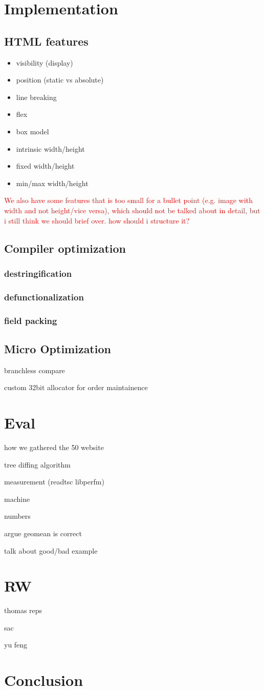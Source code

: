 \documentclass[format=acmsmall, review=false, screen=true]{acmart}
\newcommand\todo[1]{\textcolor{red}{#1}}
\begin{document}
\section{Implementation}
\subsection{HTML features}
\begin{itemize}
	\item visibility (display)
	\item position (static vs absolute)
	\item line breaking
	\item flex
	\item box model
	\item intrinsic width/height
	\item fixed width/height
	\item min/max width/height
\end{itemize}
\todo{We also have some features that is too small for a bullet point (e.g. image with width and not height/vice versa), which should not be talked about in detail, but i still think we should brief over. how should i structure it?}
\subsection{Compiler optimization}
\subsubsection{destringification}
\subsubsection{defunctionalization}
\subsubsection{field packing}
\subsection{Micro Optimization}
branchless compare

custom 32bit allocator for order maintainence

\section{Eval}
how we gathered the 50 website

tree diffing algorithm

measurement (readtsc libperfm)

machine

numbers

argue geomean is correct

talk about good/bad example
\section{RW}
thomas reps

sac

yu feng
\section{Conclusion}
\end{document}
